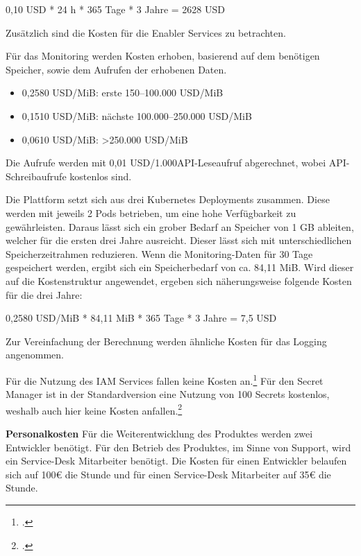 0,10 \ac{USD} * 24 h * 365 Tage * 3 Jahre = 2628 \ac{USD}

Zusätzlich sind die Kosten für die Enabler Services zu betrachten.

Für das Monitoring werden Kosten erhoben, basierend auf dem benötigen Speicher, sowie dem Aufrufen der erhobenen Daten.

\begin{itemize}
    \item 0,2580 \ac{USD}/MiB: erste 150–100.000 \ac{USD}/MiB
    \item 0,1510 \ac{USD}/MiB: nächste 100.000–250.000 \ac{USD}/MiB
    \item 0,0610 \ac{USD}/MiB: >250.000 \ac{USD}/MiB
\end{itemize}

Die Aufrufe werden mit 0,01 \ac{USD}/1.000API-Leseaufruf abgerechnet, wobei API-Schreibaufrufe kostenlos sind.

Die Plattform setzt sich aus drei Kubernetes Deployments zusammen.
Diese werden mit jeweils 2 Pods betrieben, um eine hohe Verfügbarkeit zu gewährleisten.
Daraus lässt sich ein grober Bedarf an Speicher von 1 GB ableiten, welcher für die ersten drei Jahre ausreicht.
Dieser lässt sich mit unterschiedlichen Speicherzeitrahmen reduzieren.
Wenn die Monitoring-Daten für 30 Tage gespeichert werden, ergibt sich ein Speicherbedarf von ca. 84,11 MiB.
Wird dieser auf die Kostenstruktur angewendet, ergeben sich näherungsweise folgende Kosten für die drei Jahre:

0,2580 \ac{USD}/MiB * 84,11 MiB * 365 Tage * 3 Jahre = 7,5 \ac{USD}

Zur Vereinfachung der Berechnung werden ähnliche Kosten für das Logging angenommen.

Für die Nutzung des \ac{IAM} Services fallen keine Kosten an.\footcite{GoogleIAMPricing2025}
Für den Secret Manager ist in der Standardversion eine Nutzung von 100 Secrets kostenlos, weshalb auch hier keine Kosten anfallen.\footcite{GoogleSecretManagerPricing2025}

\textbf{Personalkosten}\newline
Für die Weiterentwicklung des Produktes werden zwei Entwickler benötigt.
Für den Betrieb des Produktes, im Sinne von Support, wird ein Service-Desk Mitarbeiter benötigt.
Die Kosten für einen Entwickler belaufen sich auf 100€ die Stunde und für einen Service-Desk Mitarbeiter auf 35€ die Stunde.


